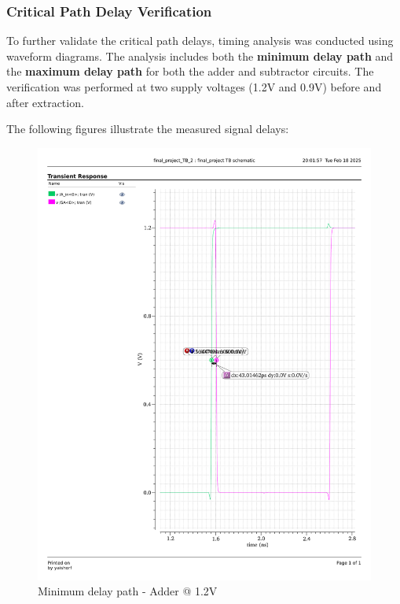 \documentclass[a4paper,12pt]{article}
\begin{document}
\subsubsection{Critical Path Delay Verification}

To further validate the critical path delays, timing analysis was conducted using waveform diagrams. The analysis includes both the \textbf{minimum delay path} and the \textbf{maximum delay path} for both the adder and subtractor circuits. The verification was performed at two supply voltages (1.2V and 0.9V) before and after extraction.

The following figures illustrate the measured signal delays:

\begin{figure}[H]
    \centering
    \begin{minipage}{0.49\textwidth}
        \centering
        \includegraphics[width=\textwidth]{delay/CP_min_add_1.2.pdf}
        \caption{Minimum delay path - Adder @ 1.2V}
    \end{minipage}

\end{figure}
\end{document}

